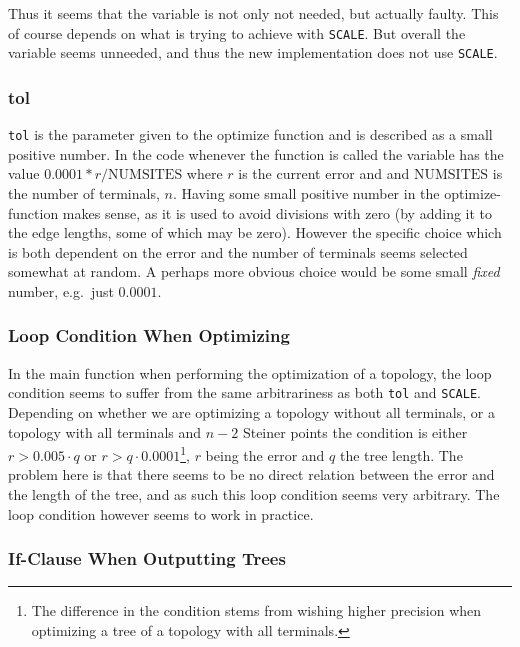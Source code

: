 Thus it seems that the variable is not only not needed, but actually faulty.
This of course depends on what \citeauthor{smith1992} is trying to achieve with \texttt{SCALE}.
But overall the variable seems unneeded, and thus the new implementation does
not use \texttt{SCALE}.

\subsubsection{tol}
\label{sec:tol}

\texttt{tol} is the parameter given to the optimize function and is described as
a small positive number. In the code whenever the function is called the
variable has the value $0.0001*r/\text{NUMSITES}$ where $r$ is the current
error and and $\text{NUMSITES}$ is the number of terminals, $n$. Having some
small positive number in the optimize-function makes sense, as it is used to
avoid divisions with zero (by adding it to the edge lengths, some of which may
be zero). However the specific choice which is both dependent on the error and
the number of terminals seems selected somewhat at random. A perhaps more
obvious choice would be some small \textit{fixed} number, e.g.\ just
$0.0001$.

\subsubsection{Loop Condition When Optimizing}
\label{sec:loop-condition-when-1}

In the main function when performing the optimization of a topology, the loop
condition seems to suffer from the same arbitrariness as both \texttt{tol} and
\texttt{SCALE}. Depending on whether we are optimizing a topology without all
terminals, or a topology with all terminals and $n-2$ Steiner points the
condition is either $r > 0.005 \cdot q$ or $r > q \cdot 0.0001$\footnote{The
  difference in the condition stems from wishing higher precision when
  optimizing a tree of a topology with all terminals.}, $r$ being the error and
$q$ the tree length. The problem here is that there seems to be no direct relation
between the error and the length of the tree, and as such this loop condition
seems very arbitrary. The loop condition however seems to work in practice.

\subsubsection{If-Clause When Outputting Trees}
\label{sec:if-clause-when}

